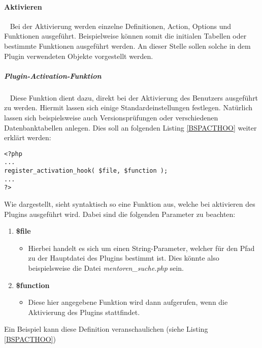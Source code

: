 \paragraph{Aktivieren}\label{aktvfunk}\ \newline
Bei der Aktivierung werden einzelne Definitionen, Action, Options und Funktionen ausgeführt. Beispielweise können somit die initialen Tabellen oder bestimmte Funktionen ausgeführt werden. An dieser Stelle sollen solche in dem Plugin verwendeten Objekte vorgestellt werden.
\subparagraph{Plugin-Activation-Funktion}\ \newline
Diese Funktion dient dazu, direkt bei der Aktivierung des Benutzers ausgeführt zu werden. Hiermit lassen sich einige Standardeinstellungen festlegen. Natürlich lassen sich beispielsweise auch Versionsprüfungen oder verschiedenen Datenbanktabellen anlegen.\newline
Dies soll an folgenden Listing \ref{BSPACTHOO} weiter erklärt werden:
\begin{lstlisting}
<?php 
...
register_activation_hook( $file, $function ); 
...
?> 
\end{lstlisting}
Wie dargestellt, sieht syntaktisch so eine Funktion aus, welche bei aktivieren des Plugins ausgeführt wird. Dabei sind die folgenden Parameter zu beachten:
\begin{enumerate}
	\item \textbf{\$file}
	\begin{itemize}
		\item Hierbei handelt es sich um einen String-Parameter, welcher für den Pfad zu der Hauptdatei des Plugins bestimmt ist. Dies könnte also beispielsweise die Datei \emph{mentoren\_suche.php} sein.
	\end{itemize}
	\item \textbf{\$function}
	\begin{itemize}
		\item Diese hier angegebene Funktion wird dann aufgerufen, wenn die Aktivierung des Plugins stattfindet.
	\end{itemize}
\end{enumerate}
Ein Beispiel kann diese Definition veranschaulichen (siehe Listing \ref{BSPACTHOO})
